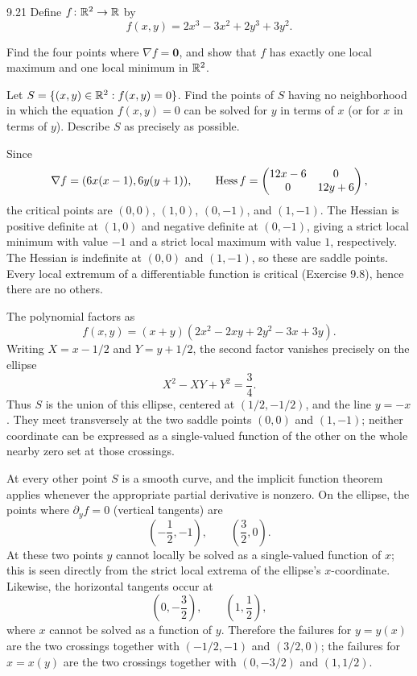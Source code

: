 \documentclass[11pt,oneside]{article}
\begin{document}
\begin{exercise}{9.21}
Define $f\colon\mathbb{R}^2\to\mathbb{R}$ by
\[
 f(x,y)=2x^3-3x^2+2y^3+3y^2.
\]
\begin{exercisesubparts}
\item Find the four points where $\nabla f=\mathbf0$, and show that $f$ has exactly one local maximum and one local minimum in $\mathbb{R}^2$.
\item Let $S=\{(x,y)\in\mathbb{R}^2:f(x,y)=0\}$. Find the points of $S$ having no neighborhood in which the equation $f(x,y)=0$ can be solved for $y$ in terms of $x$ (or for $x$ in terms of $y$). Describe $S$ as precisely as possible.
\end{exercisesubparts}
\end{exercise}
\begin{solution}
\begin{exercisesubparts}
\item Since
\[
 \nabla f=(6x(x-1),6y(y+1)),\qquad
 \operatorname{Hess} f=\begin{pmatrix}12x-6&0\\0&12y+6\end{pmatrix},
\]
the critical points are $(0,0)$, $(1,0)$, $(0,-1)$, and $(1,-1)$. The Hessian is positive definite at $(1,0)$ and negative definite at $(0,-1)$, giving a strict local minimum with value $-1$ and a strict local maximum with value $1$, respectively. The Hessian is indefinite at $(0,0)$ and $(1,-1)$, so these are saddle points. Every local extremum of a differentiable function is critical (Exercise 9.8), hence there are no others.
\item The polynomial factors as
\[
 f(x,y)=(x+y)(2x^2-2xy+2y^2-3x+3y).
\]
Writing $X=x-1/2$ and $Y=y+1/2$, the second factor vanishes precisely on the ellipse
\[
 X^2-XY+Y^2=\frac34.
\]
Thus $S$ is the union of this ellipse, centered at $(1/2,-1/2)$, and the line $y=-x$. They meet transversely at the two saddle points $(0,0)$ and $(1,-1)$; neither coordinate can be expressed as a single-valued function of the other on the whole nearby zero set at those crossings.

At every other point $S$ is a smooth curve, and the implicit function theorem applies whenever the appropriate partial derivative is nonzero. On the ellipse, the points where $\partial_y f=0$ (vertical tangents) are
\[
 \left(-\frac12,-1\right),\qquad \left(\frac32,0\right).
\]
At these two points $y$ cannot locally be solved as a single-valued function of $x$; this is seen directly from the strict local extrema of the ellipse's $x$-coordinate. Likewise, the horizontal tangents occur at
\[
 \left(0,-\frac32\right),\qquad \left(1,\frac12\right),
\]
where $x$ cannot be solved as a function of $y$. Therefore the failures for $y=y(x)$ are the two crossings together with $(-1/2,-1)$ and $(3/2,0)$; the failures for $x=x(y)$ are the two crossings together with $(0,-3/2)$ and $(1,1/2)$.
\end{exercisesubparts}
\end{solution}
\end{document}
